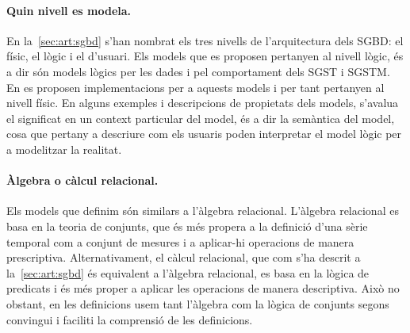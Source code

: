 



\paragraph{Quin nivell es modela.}
En la~\autoref{sec:art:sgbd} s'han nombrat els tres nivells de
l'arquitectura dels \gls {SGBD}: el físic, el lògic i el d'usuari.
Els models que es proposen pertanyen al nivell lògic, és a dir són
models lògics per les dades i pel comportament dels \gls{SGST} i
\gls{SGSTM}.  En  es
proposen implementacions per a aquests models i per tant pertanyen al
nivell físic.  En alguns exemples i descripcions de propietats dels
models, s'avalua el significat en un context particular del model, és
a dir la semàntica del model, cosa que pertany a descriure com els
usuaris poden interpretar el model lògic per a modelitzar la realitat.





\paragraph{Àlgebra o càlcul relacional.} Els models que definim són
similars a l'àlgebra relacional. L'àlgebra relacional es basa en la
teoria de conjunts, que és més propera a la definició d'una sèrie
temporal com a conjunt de mesures i a aplicar-hi operacions de manera
prescriptiva. Alternativament, el càlcul relacional, que com s'ha
descrit a la~\autoref{sec:art:sgbd} és equivalent a
l'àlgebra relacional, es basa en la lògica de predicats i és més
proper a aplicar les operacions de manera descriptiva. Això no
obstant, en les definicions usem tant l'àlgebra com la lògica de
conjunts segons convingui i faciliti la comprensió de les definicions.




